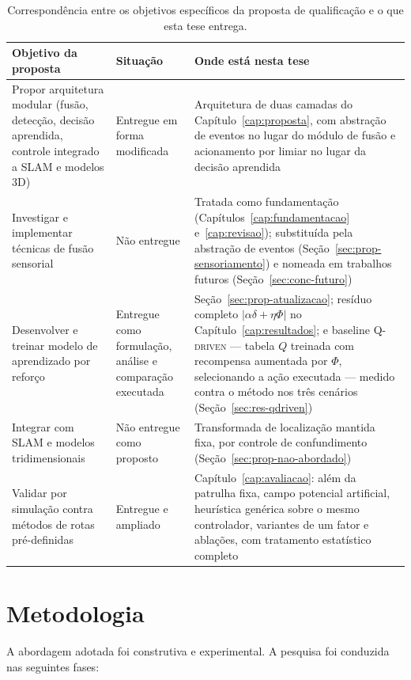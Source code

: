 \begin{table}[htb]
\centering
\caption{Correspondência entre os objetivos específicos da proposta de qualificação e
o que esta tese entrega.}
\label{tab:intro-escopo}
\footnotesize
\begin{tabular}{p{}p{}p{}}
\hline
\textbf{Objetivo da proposta} & \textbf{Situação} & \textbf{Onde está nesta tese}\\
\hline
Propor arquitetura modular (fusão, detecção, decisão aprendida, controle integrado a
\ac{SLAM} e modelos 3D) &
Entregue em forma modificada &
Arquitetura de duas camadas do Capítulo~\ref{cap:proposta}, com abstração de eventos
no lugar do módulo de fusão e acionamento por limiar no lugar da decisão aprendida\\
\hline
Investigar e implementar técnicas de fusão sensorial &
Não entregue &
Tratada como fundamentação (Capítulos~\ref{cap:fundamentacao}
e~\ref{cap:revisao}); substituída pela abstração de eventos
(Seção~\ref{sec:prop-sensoriamento}) e nomeada em trabalhos futuros
(Seção~\ref{sec:conc-futuro})\\
\hline
Desenvolver e treinar modelo de aprendizado por reforço &
Entregue como formulação, análise e comparação executada &
Seção~\ref{sec:prop-atualizacao}; resíduo completo
$|\alpha\delta+\eta\Phi|$ no Capítulo~\ref{cap:resultados}; e baseline
\textsc{Q-driven} --- tabela $Q$ treinada com recompensa aumentada por $\Phi$,
selecionando a ação executada --- medido contra o método nos três cenários
(Seção~\ref{sec:res-qdriven})\\
\hline
Integrar com \ac{SLAM} e modelos tridimensionais &
Não entregue como proposto &
Transformada de localização mantida fixa, por controle de confundimento
(Seção~\ref{sec:prop-nao-abordado})\\
\hline
Validar por simulação contra métodos de rotas pré-definidas &
Entregue e ampliado &
Capítulo~\ref{cap:avaliacao}: além da patrulha fixa, campo potencial artificial,
heurística genérica sobre o mesmo controlador, variantes de um fator e ablações,
com tratamento estatístico completo\\
\hline
\end{tabular}
\end{table}

\section{Metodologia}

A abordagem adotada foi construtiva e experimental. A pesquisa foi conduzida nas
seguintes fases:

